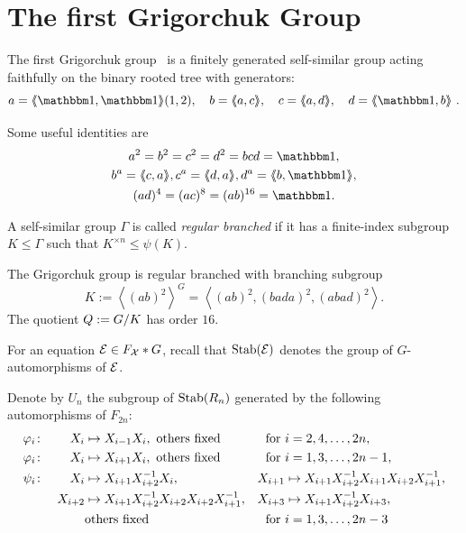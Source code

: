 \documentclass[a4paper,11pt]{amsart}
\begin{document}
\section{The first Grigorchuk Group}\label{sec:GrigorchukGroup}
The first Grigorchuk group~\cite{Grigorchuk:Burnside} is a finitely
generated self-similar group acting faithfully on the binary rooted
tree with generators:
\[a=\pair{\id,\id}(1,2),\quad b=\pair{a,c},\quad c=\pair{a,d},\quad d=\pair{\id,b}\ . \]

Some useful identities are
\begin{gather*}
  a^2=b^2=c^2=d^2=bcd=\id,\\
  b^a= \pair{c,a}, c^a=\pair{d,a}, d^a=\pair{b,\id},\\
  (ad)^4=(ac)^8=(ab)^{16}= \id.
\end{gather*}
\begin{defi}
 A self-similar group $\Gamma$ is called \emph{regular branched} if it
 has a finite-index subgroup $K\leq \Gamma$ such that $K^{\times n} \leq \psi(K)$.
\end{defi}
\begin{lem}\label{lem:subgroupK}
The Grigorchuk group is regular branched with branching subgroup 
 \[K:= \left<(ab)^2\right>^G=\left< (ab)^2,(bada)^2,(abad)^2 \right>. \]
 The quotient $Q := {G/K}$ has order $16$.
\end{lem}

For an equation $\mathcal{E}\in F_{\mathcal X}*G$, recall that
$\operatorname{Stab}(\mathcal{E})$ denotes the group of $G$-automorphisms of $\mathcal{E}$.

  Denote by $U_n$ the subgroup of $\operatorname{Stab}(R_n)$ generated by the following automorphisms of $F_{2n}$:
 \begin{align*}
  \varphi_i&\colon& X_i&\mapsto X_{i-1}X_i, \textup{ others fixed} & \textup{for }&i=2,4,\dotsc,2n , \\
  \varphi_i&\colon&X_i&\mapsto X_{i+1}X_i, \textup{ others fixed} & \textup{for }&i=1,3,\dotsc,2n-1 ,\\
  \psi_i&\colon&X_i&\mapsto X_{i+1}X_{i+2}^{-1}X_i, &X_{i+1}&\mapsto X_{i+1}X_{i+2}^{-1}X_{i+1}X_{i+2}X_{i+1}^{-1},\\  
  &&X_{i+2}&\mapsto X_{i+1}X_{i+2}^{-1}X_{i+2}X_{i+2}X_{i+1}^{-1}, &X_{i+3}&\mapsto X_{i+1}X_{i+2}^{-1}X_{i+3},\\
           &&&\textup{others fixed} & \textup{for }&i=1,3,\dotsc,2n-3 \\  
\end{align*}
\end{document}

